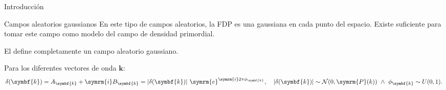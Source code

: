 \begin{frame}{Introducción}
    \begin{block}{Campos aleatorios gaussianos}
        En este tipo de campos aleatorios, la FDP es una gaussiana en cada punto del espacio. Existe  suficiente para tomar este campo como modelo del campo de densidad primordial.
        \begin{center}
            El  define completamente un campo aleatorio gaussiano.
        \end{center}
        Para los diferentes vectores de onda \(\symbf{k}\):
        \begin{equation*}
            \delta(\symbf{k})=A_{\symbf{k}}+\symrm{i}B_{\symbf{k}}=\left|\delta(\symbf{k})\right|\,\symrm{e}^{\symrm{i}2\pi\phi_{\symbf{k}}},\quad \left|\delta(\symbf{k})\right|\sim\mathcal{N}(0,\symrm{P}(k))\ \wedge\ \phi_{\symbf{k}}\sim U(0,1).
        \end{equation*}
    \end{block}
\end{frame}